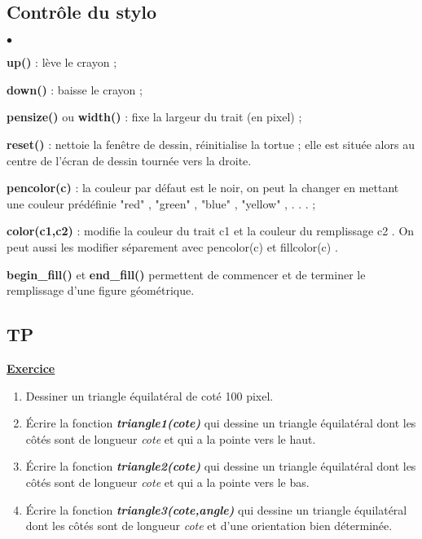 \documentclass[10pt,dvipsnames,  dvips]{article}
\newcounter{numeroexo}[section]
\newcommand{\exerciceun}[1]{\par\stepcounter{numeroexo}\hspace{-0.5cm}\underline{\textbf{Exercice \arabic{numeroexo}}}\quad \textit{#1}\:}
\begin{document}
\subsection{Contrôle du stylo}

\begin{list}{$\bullet$}{}
\item  \textbf{up()} : lève le crayon ;
\item  \textbf{down()} : baisse le crayon ;
\item  \textbf{pensize()} ou \textbf{width()} : fixe la largeur du trait (en pixel) ;
\item  \textbf{reset()} : nettoie la fenêtre de dessin, réinitialise la tortue ; elle est située alors au centre de l’écran de
dessin tournée vers la droite.
\item  \textbf{pencolor(c)} : la couleur par défaut est le noir, on peut la changer en mettant une couleur prédéfinie
"red" , "green" , "blue" , "yellow" , . . . ;
\item  \textbf{color(c1,c2)} : modifie la couleur du trait c1 et la couleur du remplissage c2 . On peut aussi les
modifier séparement avec pencolor(c) et fillcolor(c) .
\item  \textbf{begin\string_fill()} et \textbf{end\_fill()} permettent de commencer et de terminer le remplissage d’une
figure géométrique.
\end{list}

\newpage
\subsection{TP}


\exerciceun{}


\begin{enumerate}
\item Dessiner un triangle équilatéral de coté 100 pixel.
\item Écrire la fonction \textbf{\textit{triangle1(cote)}} qui dessine un triangle équilatéral dont les côtés sont de longueur \textit{cote} et qui a la pointe vers le haut.
\item Écrire la fonction \textbf{\textit{triangle2(cote)}} qui dessine un triangle équilatéral dont les côtés sont de longueur \textit{cote} et qui a la pointe vers le bas.
\item Écrire la fonction \textbf{\textit{triangle3(cote,angle)}} qui dessine un triangle équilatéral dont les côtés sont de longueur \textit{cote} et d’une orientation bien déterminée.
\end{enumerate}
\end{document}
